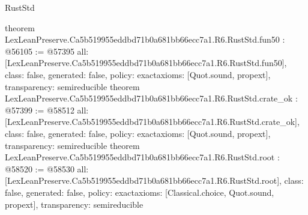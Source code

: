 \begin{lexlean}{RustStd}
\begin{coremodule}
{}
theorem LexLeanPreserve.Ca5b519955eddbd71b0a681bb66ecc7a1.R6.RustStd.fun50 : @56105 := @57395 {
  all: [LexLeanPreserve.Ca5b519955eddbd71b0a681bb66ecc7a1.R6.RustStd.fun50],
  class: false,
  generated: false,
  policy: exact{axioms: [Quot.sound, propext]},
  transparency: semireducible
}
theorem LexLeanPreserve.Ca5b519955eddbd71b0a681bb66ecc7a1.R6.RustStd.crate_ok : @57399 := @58512 {
  all: [LexLeanPreserve.Ca5b519955eddbd71b0a681bb66ecc7a1.R6.RustStd.crate_ok],
  class: false,
  generated: false,
  policy: exact{axioms: [Quot.sound, propext]},
  transparency: semireducible
}
theorem LexLeanPreserve.Ca5b519955eddbd71b0a681bb66ecc7a1.R6.RustStd.root : @58520 := @58530 {
  all: [LexLeanPreserve.Ca5b519955eddbd71b0a681bb66ecc7a1.R6.RustStd.root],
  class: false,
  generated: false,
  policy: exact{axioms: [Classical.choice, Quot.sound, propext]},
  transparency: semireducible
}


\end{coremodule}
\end{lexlean}
